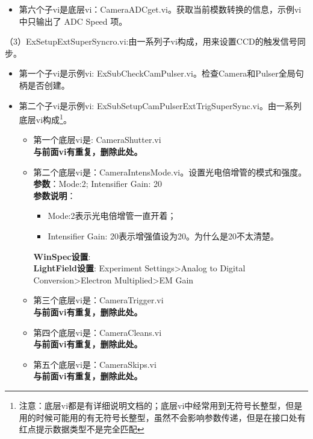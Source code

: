 \begin{itemize}
\item 第六个子vi是底层vi：CameraADCget.vi。获取当前模数转换的信息，示例vi中只输出了 ADC Speed 项。
\end{itemize}


（3）ExSetupExtSuperSyncro.vi:由一系列子vi构成，用来设置CCD的触发信号同步。
\begin{itemize}
\item 第一个子vi是示例vi: ExSubCheckCamPulser.vi。检查Camera和Pulser全局句柄是否创建。

\item 第二个子vi是示例vi: ExSubSetupCamPulserExtTrigSuperSync.vi。由一系列底层vi构成\footnote{注意：底层vi都是有详细说明文档的；底层vi中经常用到无符号长整型，但是用的时候可能用的有无符号长整型，虽然不会影响参数传递，但是在接口处有红点提示数据类型不是完全匹配}。
\begin{itemize}
\item 第一个底层vi是: CameraShutter.vi
\\ \textbf{与前面vi有重复，删除此处。}

\item 第二个底层vi是：CameraIntensMode.vi。设置光电倍增管的模式和强度。
\\ \textbf{参数}：Mode:2; Intensifier Gain: 20
\\ \textbf{参数说明}：
\begin{itemize}
\item Mode:2表示光电倍增管一直开着；
\item Intensifier Gain: 20表示增强值设为20。为什么是20不太清楚。
\end{itemize}
\textbf{WinSpec设置}:
\\ \textbf{LightField设置}: Experiment Settings>Analog to Digital Conversion>Electron Multiplied>EM Gain

\item 第三个底层vi是：CameraTrigger.vi
\\ \textbf{与前面vi有重复，删除此处。}


\item 第四个底层vi是：CameraCleans.vi
\\ \textbf{与前面vi有重复，删除此处。}

\item 第五个底层vi是：CameraSkips.vi
\\ \textbf{与前面vi有重复，删除此处。}


\end{itemize}
\end{itemize}
